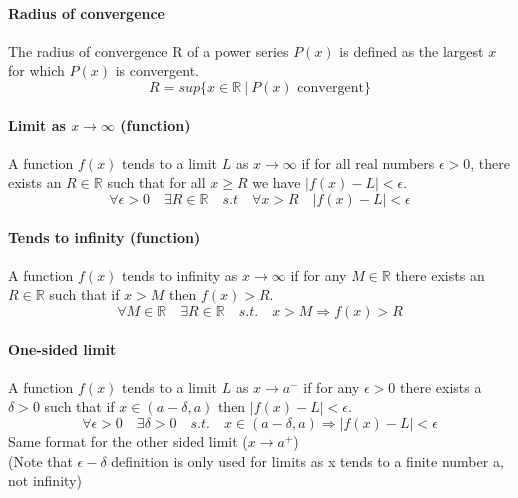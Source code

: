 \documentclass{scrartcl}
\newcommand{\R}{\mathbb{R}}
\begin{document}
\paragraph{Radius of convergence}
The radius of convergence R of a power series $ P(x) $ is defined as the largest $ x $ for which $ P(x) $ is convergent.
\begin{equation}
R = sup\{x \in \R \ | \ P(x) \textrm{ convergent}\}
\end{equation}

\paragraph{Limit as $ x \to \infty $ (function)}
A function $ f(x) $ tends to a limit $ L $ as $ x \to \infty $ if for all real numbers $ \epsilon > 0 $, there exists an $ R \in \R $ such that for all $ x \geq R $ we have $ |f(x) - L| < \epsilon $.
\begin{equation}
\forall \epsilon > 0 \quad \exists R \in \R \quad s.t \quad \forall x > R \quad |f(x) - L| < \epsilon
\end{equation}

\paragraph{Tends to infinity (function)}
A function $ f(x) $ tends to infinity as $ x \to \infty $ if for any $ M \in \R $ there exists an $ R \in \R $ such that if $ x > M $ then $ f(x) > R $.
\begin{equation}
\forall M \in \R \quad \exists R \in \R \quad s.t. \quad x > M \Rightarrow f(x) > R
\end{equation}

\paragraph{One-sided limit}
A function $ f(x) $ tends to a limit $ L $ as $ x \to a^{-} $ if for any $ \epsilon > 0 $ there exists a $ \delta > 0 $ such that if $ x \in (a - \delta, a) $ then $ |f(x) - L| < \epsilon $.
\begin{equation}
\forall \epsilon > 0 \quad \exists \delta > 0 \quad s.t. \quad x \in (a - \delta, a) \Rightarrow |f(x) - L| < \epsilon
\end{equation}
\noindent Same format for the other sided limit ($ x \to a^{+} $)
\\
(Note that $ \epsilon - \delta $ definition is only used for limits as x tends to a finite number a, not infinity)
\end{document}
